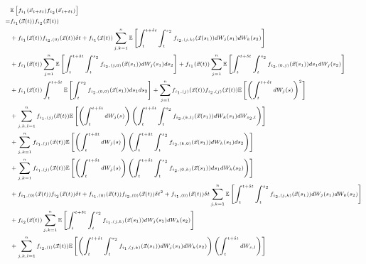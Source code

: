 \documentclass[12pt]{article}
\begin{document}
\begin{equation} \label{eq:E12}
\scriptsize
\begin{aligned}
&\mathbb{E} \left[ f_{i_1}(\vec{x}_{t + \delta t}) f_{i_2}(\vec{x}_{t + \delta t}) \right] \\
=& 
f_{i_1}(\vec{x}(t)) f_{i_2}(\vec{x}(t)) \\
&+  f_{i_1}(\vec{x}(t)) f_{{i_2},(0)}(\vec{x}(t)) \delta t
+ f_{i_1}(\vec{x}(t)) \sum_{j, k=1}^n \mathbb{E} \left[ \int_t^{t+\delta t} \int_t^{s_2} f_{{i_2}, (j,k)}(\vec{x}(s_1)) dW_j(s_1) dW_k(s_2) \right] \\
&+ f_{i_1}(\vec{x}(t)) \sum_{j=1}^n \mathbb{E}  \left[ \int_t^{t+\delta t} \int_t^{s_2} f_{{i_2}, (j,0)}(\vec{x}(s_1)) dW_j(s_1) ds_2 \right] 
+ f_{i_1}(\vec{x}(t)) \sum_{j=1}^n \mathbb{E} \left[ \int_t^{t+\delta t} \int_t^{s_2} f_{{i_2}, (0,j)}(\vec{x}(s_1)) ds_1 dW_j(s_2) \right] \\
&+ f_{i_1}(\vec{x}(t)) \int_t^{t+\delta t} \mathbb{E} \left[ \int_t^{s_2} f_{{i_2}, (0,0)}(\vec{x}(s_1)) ds_1 ds_2 \right]
+  \sum_{j=1}^n f_{{i_1},(j)}(\vec{x}(t)) f_{{i_2},(j)}(\vec{x}(t)) \mathbb{E} \left[ \left( \int_t^{t + \delta t} dW_j(s) \right)^2 \right] \\
&+ \sum_{j,k,l=1}^n f_{{i_1},(j)}(\vec{x}(t)) \mathbb{E} \left[ \left( \int_t^{t + \delta t} dW_j(s) \right) \left( \int_t^{t+\delta t} \int_t^{s_2} f_{{i_2},(k,l)}(\vec{x}(s_1)) dW_k(s_1) dW_{s_2, l} \right) \right] \\
&+ \sum_{j,k=1}^n f_{{i_1},(j)}(\vec{x}(t)) \mathbb{E} \left[ \left( \int_t^{t + \delta t} dW_j(s) \right)\left( \int_t^{t+\delta t} \int_t^{s_2} f_{{i_2},(k,0)}(\vec{x}(s_1)) dW_k(s_1) ds_2 \right) \right]\\
&+ \sum_{j, k=1}^n f_{{i_1},(j)}(\vec{x}(t)) \mathbb{E} \left[ \left( \int_t^{t + \delta t} dW_j(s) \right) \left( \int_t^{t+\delta t} \int_t^{s_2} f_{{i_2},(0,k)}(\vec{x}(s_1)) ds_1 dW_k(s_2) \right) \right] \\
&+f_{{i_1},(0)}(\vec{x}(t)) f_{i_2}(\vec{x}(t)) \delta t
+  f_{{i_1},(0)}(\vec{x}(t))f_{{i_2},(0)}(\vec{x}(t)) \delta t^2
+  f_{{i_1},(0)}(\vec{x}(t)) \delta t \sum_{j, k=1}^n \mathbb{E} \left[ \int_t^{t+\delta t} \int_t^{s_2} f_{{i_2},(j,k)}(\vec{x}(s_1)) dW_j(s_1) dW_k(s_2) \right] \\
&+f_{i_2}(\vec{x}(t)) \sum_{j, k=1}^n \mathbb{E} \left[ \int_t^{t+\delta t} \int_t^{s_2} f_{{i_1},(j,k)}(\vec{x}(s_1)) dW_j(s_1) dW_k(s_2) \right] \\
&+  \sum_{j, k, l=1}^n  f_{{i_2},(l)}(\vec{x}(t))\mathbb{E} \left[ \left( \int_t^{t+\delta t} \int_t^{s_2} f_{{i_1},(j,k)}(\vec{x}(s_1)) dW_j(s_1) dW_k(s_2) \right) \left( \int_t^{t + \delta t} dW_{s,l} \right) \right] \\

\end{aligned}
\end{equation}
\end{document}
